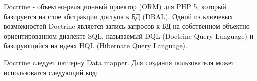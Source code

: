 Doctrine - объектно-реляционный проектор (ORM) для PHP 5, который базируется на слое абстракции доступа к БД (DBAL). Одной из ключевых возможностей Doctrine является запись запросов к БД на собственном объектно-ориентированном диалекте SQL, называемый DQL (Doctrine Query Language) и базирующийся на идеях HQL (Hibernate Query Language).

Doctrine cледует паттерну Data mapper. Для создания пользователя может использоватся следующий кодː